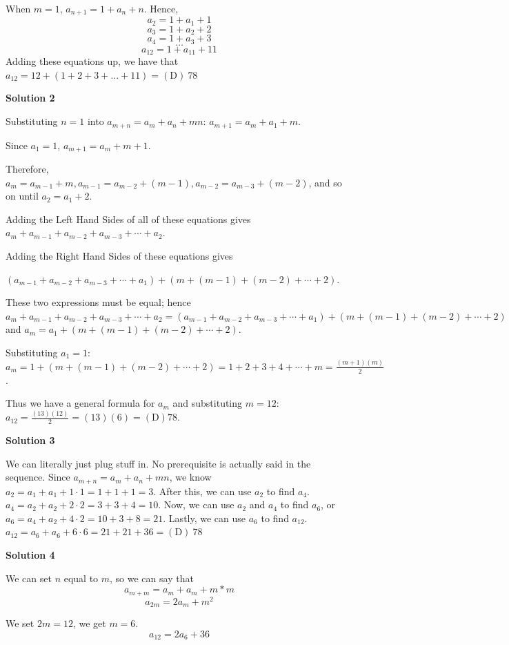 \begin{enumerate}
When $m=1$, $a_{n+1}=1+a_n+n$. Hence,
 \[a_{2}=1+a_1+1\]
 \[a_{3}=1+a_2+2\]
 \[a_{4}=1+a_3+3\]
 \[\dots\]
 \[a_{12}=1+a_{11}+11\]Adding these equations up, we have that $a_{12}=12+(1+2+3+...+11)=\boxed{\mathrm{(D) \ } 78}$




\textbf{Solution 2}

Substituting $n=1$ into $a_{m+n}=a_m+a_n+mn$: $a_{m+1}=a_m+a_{1}+m$.

 Since $a_1 = 1$, $a_{m+1}=a_m+m+1$.

 Therefore, $a_m = a_{m-1} + m, a_{m-1}=a_{m-2}+(m-1), a_{m-2} = a_{m-3} + (m-2)$, and so on until $a_2 = a_1 + 2$.

 Adding the Left Hand Sides of all of these equations gives $a_m + a_{m-1} + a_{m-2} + a_{m-3} + \cdots + a_2$.

 Adding the Right Hand Sides of these equations gives 

 $(a_{m-1} + a_{m-2} + a_{m-3} + \cdots + a_1) + (m + (m-1) + (m-2) + \cdots + 2)$.

 These two expressions must be equal; hence $a_m + a_{m-1} + a_{m-2} + a_{m-3} + \cdots + a_2 = (a_{m-1} + a_{m-2} + a_{m-3} + \cdots + a_1) + (m + (m-1) + (m-2) + \cdots + 2)$ and $a_m = a_1 + (m + (m-1) + (m-2) + \cdots + 2)$.

 Substituting $a_1 = 1$: $a_m = 1 + (m + (m-1) + (m-2) + \cdots + 2) = 1+2+3+4+ \cdots +m = \frac{(m+1)(m)}{2}$.

 Thus we have a general formula for $a_m$ and substituting $m=12$: $a_{12} = \frac{(13)(12)}{2} = (13)(6) = \boxed{\mathrm{(D)} 78}$.

 



\textbf{Solution 3}

We can literally just plug stuff in. No prerequisite is actually said in the sequence. Since $a_{m+n} = a_m+a_n +mn$, we know $a_2=a_1+a_1+1\cdot1=1+1+1=3$. After this, we can use $a_2$ to find $a_4$. $a_4=a_2+a_2+2\cdot 2 = 3+3+4 = 10$. Now, we can use $a_2$ and $a_4$ to find $a_6$, or $a_6=a_4+a_2+4\cdot 2 = 10+3+8=21$. Lastly, we can use $a_6$ to find $a_{12}$. $a_{12} = a_6+a_6+6\cdot 6 = 21+21+36= \boxed{\mathrm{(D) \ } 78}$




\textbf{Solution 4}

We can set $n$ equal to $m$, so we can say that 
 \[a_{m + m} = a_m + a_m + m*m\]
 \[a_{2m} = 2a_m + m^2\]

 We set $2m = 12$, we get $m = 6$.
 \[a_{12} = 2a_6 + 36\]


\end{enumerate}

